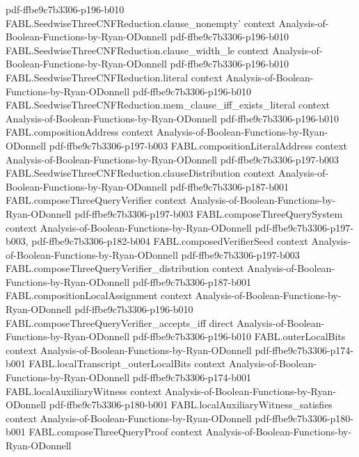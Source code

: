 \begin{theorem}
  {pdf-ffbe9c7b3306-p196-b010}
\proofstep
  {FABL.SeedwiseThreeCNFReduction.clause_nonempty'}
  {context}
  {Analysis-of-Boolean-Functions-by-Ryan-ODonnell}
  {pdf-ffbe9c7b3306-p196-b010}
\proofstep
  {FABL.SeedwiseThreeCNFReduction.clause_width_le}
  {context}
  {Analysis-of-Boolean-Functions-by-Ryan-ODonnell}
  {pdf-ffbe9c7b3306-p196-b010}
\proofstep
  {FABL.SeedwiseThreeCNFReduction.literal}
  {context}
  {Analysis-of-Boolean-Functions-by-Ryan-ODonnell}
  {pdf-ffbe9c7b3306-p196-b010}
\proofstep
  {FABL.SeedwiseThreeCNFReduction.mem_clause_iff_exists_literal}
  {context}
  {Analysis-of-Boolean-Functions-by-Ryan-ODonnell}
  {pdf-ffbe9c7b3306-p196-b010}
\proofstep
  {FABL.compositionAddress}
  {context}
  {Analysis-of-Boolean-Functions-by-Ryan-ODonnell}
  {pdf-ffbe9c7b3306-p197-b003}
\proofstep
  {FABL.compositionLiteralAddress}
  {context}
  {Analysis-of-Boolean-Functions-by-Ryan-ODonnell}
  {pdf-ffbe9c7b3306-p197-b003}
\proofstep
  {FABL.SeedwiseThreeCNFReduction.clauseDistribution}
  {context}
  {Analysis-of-Boolean-Functions-by-Ryan-ODonnell}
  {pdf-ffbe9c7b3306-p187-b001}
\proofstep
  {FABL.composeThreeQueryVerifier}
  {context}
  {Analysis-of-Boolean-Functions-by-Ryan-ODonnell}
  {pdf-ffbe9c7b3306-p197-b003}
\proofstep
  {FABL.composeThreeQuerySystem}
  {context}
  {Analysis-of-Boolean-Functions-by-Ryan-ODonnell}
  {pdf-ffbe9c7b3306-p197-b003,
    pdf-ffbe9c7b3306-p182-b004}
\proofstep
  {FABL.composedVerifierSeed}
  {context}
  {Analysis-of-Boolean-Functions-by-Ryan-ODonnell}
  {pdf-ffbe9c7b3306-p197-b003}
\proofstep
  {FABL.composeThreeQueryVerifier_distribution}
  {context}
  {Analysis-of-Boolean-Functions-by-Ryan-ODonnell}
  {pdf-ffbe9c7b3306-p187-b001}
\proofstep
  {FABL.compositionLocalAssignment}
  {context}
  {Analysis-of-Boolean-Functions-by-Ryan-ODonnell}
  {pdf-ffbe9c7b3306-p196-b010}
\proofstep
  {FABL.composeThreeQueryVerifier_accepts_iff}
  {direct}
  {Analysis-of-Boolean-Functions-by-Ryan-ODonnell}
  {pdf-ffbe9c7b3306-p196-b010}
\proofstep
  {FABL.outerLocalBits}
  {context}
  {Analysis-of-Boolean-Functions-by-Ryan-ODonnell}
  {pdf-ffbe9c7b3306-p174-b001}
\proofstep
  {FABL.localTranscript_outerLocalBits}
  {context}
  {Analysis-of-Boolean-Functions-by-Ryan-ODonnell}
  {pdf-ffbe9c7b3306-p174-b001}
\proofstep
  {FABL.localAuxiliaryWitness}
  {context}
  {Analysis-of-Boolean-Functions-by-Ryan-ODonnell}
  {pdf-ffbe9c7b3306-p180-b001}
\proofstep
  {FABL.localAuxiliaryWitness_satisfies}
  {context}
  {Analysis-of-Boolean-Functions-by-Ryan-ODonnell}
  {pdf-ffbe9c7b3306-p180-b001}
\proofstep
  {FABL.composeThreeQueryProof}
  {context}
  {Analysis-of-Boolean-Functions-by-Ryan-ODonnell}

\end{theorem}
